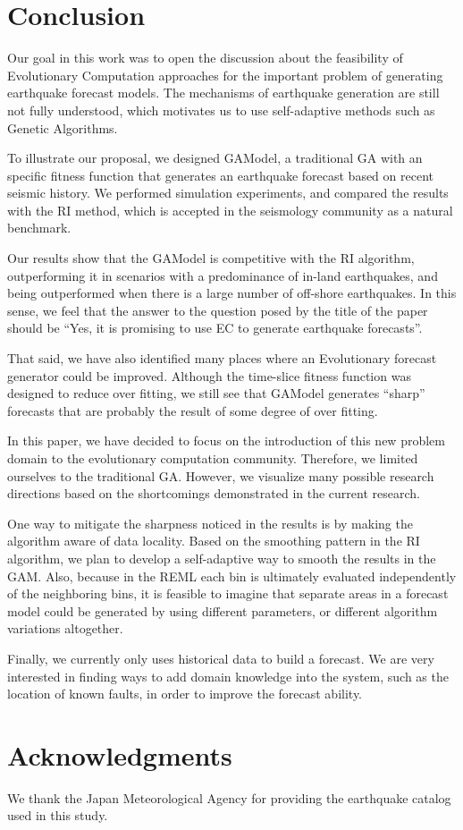 \documentclass[a4paper,twoside]{article}
\begin{document}
\section{Conclusion}

Our goal in this work was to open the discussion about the feasibility
of Evolutionary Computation approaches for the important problem of
generating earthquake forecast models. The mechanisms of earthquake
generation are still not fully understood, which motivates us to use
self-adaptive methods such as Genetic Algorithms.

To illustrate our proposal, we designed GAModel, a traditional GA with
an specific fitness function that generates an earthquake forecast
based on recent seismic history. We performed simulation experiments,
and compared the results with the RI method, which is accepted in the
seismology community as a natural benchmark.

Our results show that the GAModel is competitive with the RI
algorithm, outperforming it in scenarios with a predominance of
in-land earthquakes, and being outperformed when there is a large
number of off-shore earthquakes. In this sense, we feel that the
answer to the question posed by the title of the paper should be
``Yes, it is promising to use EC to generate earthquake forecasts''.

That said, we have also identified many places where an Evolutionary
forecast generator could be improved. Although the time-slice fitness
function was designed to reduce over fitting, we still see that GAModel
generates ``sharp'' forecasts that are probably the result of some
degree of over fitting.

In this paper, we have decided to focus on the introduction of this
new problem domain to the evolutionary computation
community. Therefore, we limited ourselves to the traditional
GA. However, we visualize many possible research directions based on
the shortcomings demonstrated in the current research.

One way to mitigate the sharpness noticed in the results is by making
the algorithm aware of data locality. Based on the smoothing pattern
in the RI algorithm, we plan to develop a self-adaptive way to smooth
the results in the GAM. Also, because in the REML each bin is
ultimately evaluated independently of the neighboring bins, it is
feasible to imagine that separate areas in a forecast model could be
generated by using different parameters, or different algorithm
variations altogether.

Finally, we currently only uses historical data to build a
forecast. We are very interested in finding ways to add domain
knowledge into the system, such as the location of known faults, in
order to improve the forecast ability.

\section{Acknowledgments}

We thank the Japan Meteorological Agency for providing the earthquake
catalog used in this study.


{\small }
\end{document}
